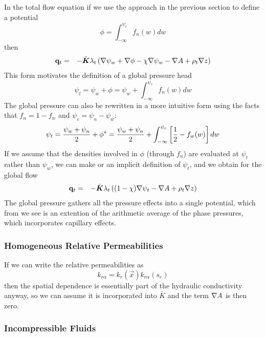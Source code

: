 \documentclass[10pt,dvips,twoside,reqno]{amsart}
\begin{document}
In the total flow equation if we use the approach in the previous
section to define a potential
\begin{equation}
  \label{eq:cap}
\phi = \int_{-\infty}^{\psi_c} f_n(w) dw 
\end{equation}
then
\begin{eqnarray}
{\bf q}_t  &=& - \bar{\mbox{{\boldmath ${K}$}}} \lambda_t \left( \nabla \psi_w + \nabla \phi - \chi \nabla \psi_w - \nabla A + \rho_t \nabla z \right) 
\end{eqnarray}
This form motivates the definition of a global pressure head
\begin{equation}
  \label{eq:globalHead}
  \psi_t = \psi_w + \phi = \psi_w + \int_{-\infty}^{\psi_c} f_n(w) dw
\end{equation}
The global pressure can also be rewritten in a more intuitive form using the facts that $f_n = 1 - f_w$ and $\psi_c = \psi_n - \psi_w$:
\begin{equation}
  \label{eq:globalHeadAvg}
  \psi_t = \frac{\psi_w + \psi_n}{2} + \phi^* = \frac{\psi_w + \psi_n}{2} + \int_{-\infty}^{\psi_c} \left[ \frac{1}{2} - f_w(w) \right] dw
\end{equation}
If we assume that the densities involved in $\phi$ (through $f_n$) are
evaluated at $\psi_t$ rather than $\psi_w$, we can make
 or  an implicit definition of
$\psi_t$, and we obtain for the global flow
\begin{eqnarray}
{\bf q}_t  &=& - \bar{\mbox{{\boldmath ${K}$}}} \lambda_t \left( (1 - \chi) \nabla \psi_t - \nabla A + \rho_t \nabla z \right) 
\end{eqnarray}
The global pressure gathers all the pressure effects into a single
potential, which from  we see is an extention of
the arithmetic average of the phase pressures, which incorporates
capillary effects.

\subsubsection{Homogeneous Relative Permeabilities}

If we can write the relative permeabilities as
\begin{equation}
  \label{eq:factoredRelPerm}
  k_{r\alpha} =k_r(\vec x) k_{r\alpha}(s_e)
\end{equation}
then the spatial dependence is essentially part of the hydraulic
conductivity anyway, so we can assume it is incorporated into
$\bar{K}$ and the term $\nabla A$ is then zero.

\subsubsection{Incompressible Fluids} 
\end{document}

